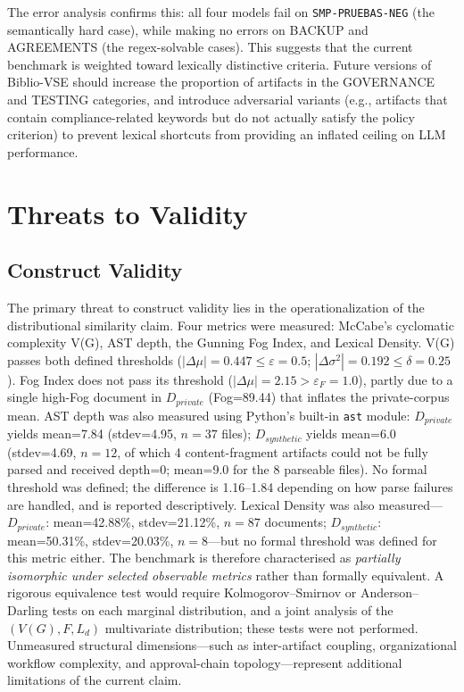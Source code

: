 \documentclass{ieeeaccess}
\begin{document}
The error analysis confirms this: all four models fail on \texttt{SMP-PRUEBAS-NEG} (the semantically hard case), while making no errors on BACKUP and AGREEMENTS (the regex-solvable cases). This suggests that the current benchmark is weighted toward lexically distinctive criteria. Future versions of Biblio-VSE should increase the proportion of artifacts in the GOVERNANCE and TESTING categories, and introduce adversarial variants (e.g., artifacts that contain compliance-related keywords but do not actually satisfy the policy criterion) to prevent lexical shortcuts from providing an inflated ceiling on LLM performance.


\section{Threats to Validity}
\label{sec:threats}

\subsection{Construct Validity}

The primary threat to construct validity lies in the operationalization of the distributional similarity claim. Four metrics were measured: McCabe's cyclomatic complexity V(G), AST depth, the Gunning Fog Index, and Lexical Density. V(G) passes both defined thresholds ($|\Delta\mu|=0.447\leq\varepsilon=0.5$; $|\Delta\sigma^2|=0.192\leq\delta=0.25$). Fog Index does not pass its threshold ($|\Delta\mu|=2.15>\varepsilon_F=1.0$), partly due to a single high-Fog document in $D_{private}$ (Fog=89.44) that inflates the private-corpus mean. AST depth was also measured using Python's built-in \texttt{ast} module: $D_{private}$ yields mean=7.84 (stdev=4.95, $n=37$ files); $D_{synthetic}$ yields mean=6.0 (stdev=4.69, $n=12$, of which 4 content-fragment artifacts could not be fully parsed and received depth=0; mean=9.0 for the 8 parseable files). No formal threshold was defined; the difference is 1.16--1.84 depending on how parse failures are handled, and is reported descriptively. Lexical Density was also measured---$D_{private}$: mean=42.88\%, stdev=21.12\%, $n=87$ documents; $D_{synthetic}$: mean=50.31\%, stdev=20.03\%, $n=8$---but no formal threshold was defined for this metric either. The benchmark is therefore characterised as \emph{partially isomorphic under selected observable metrics} rather than formally equivalent. A rigorous equivalence test would require Kolmogorov--Smirnov or Anderson--Darling tests on each marginal distribution, and a joint analysis of the $(V(G), F, L_d)$ multivariate distribution; these tests were not performed. Unmeasured structural dimensions---such as inter-artifact coupling, organizational workflow complexity, and approval-chain topology---represent additional limitations of the current claim.
\end{document}
